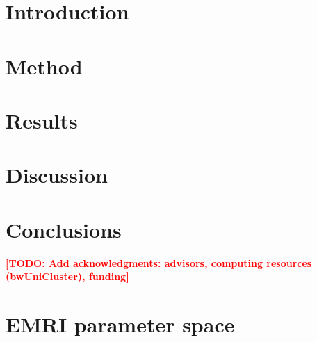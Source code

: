 \documentclass[aps,prd,twocolumn,superscriptaddress,nofootinbib]{revtex4-2}
\newcommand{\todo}[1]{\textcolor{red}{\textbf{[TODO: #1]}}}
\begin{document}
\maketitle

\section{Introduction}
\label{sec:intro}



\section{Method}
\label{sec:method}



\section{Results}
\label{sec:results}



\section{Discussion}
\label{sec:discussion}



\section{Conclusions}
\label{sec:conclusions}



\begin{acknowledgments}
\todo{Add acknowledgments: advisors, computing resources (bwUniCluster), funding}
\end{acknowledgments}



\appendix

\section{EMRI parameter space}
\label{app:parameters}


\end{document}
